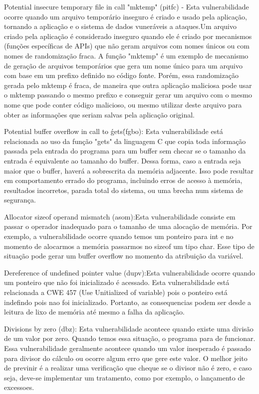 %

Potential insecure temporary file in call "mktemp" (pitfc)  - Esta vulnerabilidade ocorre quando um arquivo temporário inseguro é criado e usado pela aplicação, tornando a aplicação e o sistema de dados vuneráveis a ataques.Um arquivo criado pela aplicação é considerado inseguro quando ele é criado por mecanismos (funções específicas de APIs) que não geram arquivos com nomes únicos ou com nomes de randomização fraca. A função "mktemp" é um exemplo de mecanismo de geração de arquivos temporários que gera um nome único para um arquivo com base em um prefixo definido no código fonte. Porém, essa randomização gerada pelo mktemp é fraca, de maneira que outra aplicação maliciosa pode usar o mktemp passando o mesmo prefixo e conseguir gerar um arquivo com o mesmo nome que pode conter código malicioso, ou mesmo utilizar deste arquivo para obter as informações que seriam salvas pela aplicação original.

%

Potential buffer overflow in call to \'gets\' (fgbo): Esta vulnerabilidade está relacionada ao uso da função "gets" da linguagem C que copia toda informação passada pela entrada do programa para um buffer sem checar se o tamanho da entrada é equivalente ao tamanho do buffer. Dessa forma, caso a entrada seja maior que o buffer, haverá a sobrescrita da memória adjacente. Isso pode resultar em comportamento errado do programa, incluindo erros de acesso à memória, resultados incorretos, parada total do sistema, ou uma brecha num sistema de segurança.

%

Allocator sizeof operand mismatch (asom):Esta vulnerabilidade consiste em passar o operador inadequado para o tamanho de uma alocação de memória. Por exemplo, a vulnerabilidade ocorre quando temos um ponteiro para int e no momento de alocarmos a memória passarmos no sizeof um tipo char. Esse tipo de situação pode gerar um buffer overflow no momento da atribuição da variável.

%

Dereference of undefined pointer value (dupv):Esta vulnerabilidade ocorre quando um ponteiro que não foi inicializado é acessado. Esta vulnerabilidade está relacionada a CWE 457 (Use Unitialized of variable) pois o ponteiro está indefindo pois nao foi inicializado. Portanto, as consequencias podem ser desde a leitura de lixo de memória até mesmo a falha da aplicação.

%

Divisions by zero (dbz): Esta vulnerabilidade acontece quando existe uma divisão de um valor por zero. Quando temos essa situação, o programa para de funcionar. Essa vulnerabilidade geralmente acontece quando um valor inesperado é passado para divisor do cálculo ou ocorre algum erro que gere este valor. O melhor jeito de previnir é a realizar uma verificação que cheque se o divisor não é zero, e caso seja, deve-se implementar um tratamento, como por exemplo, o lançamento de excessoes.

